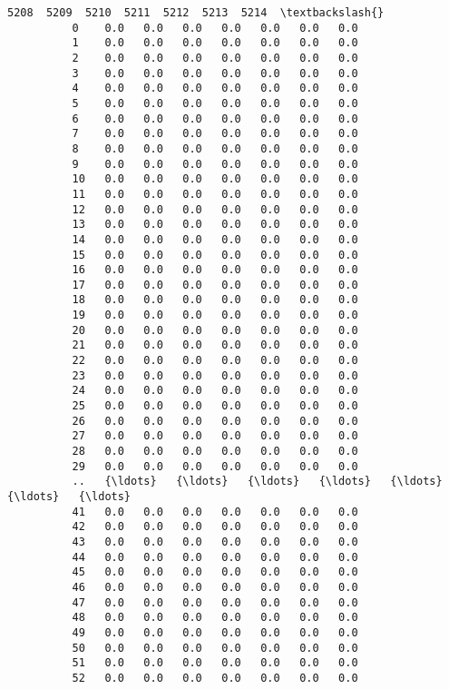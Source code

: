\documentclass[11pt]{article}
\begin{document}
\begin{Verbatim}[commandchars=\\\{\}]
              5208  5209  5210  5211  5212  5213  5214  \textbackslash{}
          0    0.0   0.0   0.0   0.0   0.0   0.0   0.0   
          1    0.0   0.0   0.0   0.0   0.0   0.0   0.0   
          2    0.0   0.0   0.0   0.0   0.0   0.0   0.0   
          3    0.0   0.0   0.0   0.0   0.0   0.0   0.0   
          4    0.0   0.0   0.0   0.0   0.0   0.0   0.0   
          5    0.0   0.0   0.0   0.0   0.0   0.0   0.0   
          6    0.0   0.0   0.0   0.0   0.0   0.0   0.0   
          7    0.0   0.0   0.0   0.0   0.0   0.0   0.0   
          8    0.0   0.0   0.0   0.0   0.0   0.0   0.0   
          9    0.0   0.0   0.0   0.0   0.0   0.0   0.0   
          10   0.0   0.0   0.0   0.0   0.0   0.0   0.0   
          11   0.0   0.0   0.0   0.0   0.0   0.0   0.0   
          12   0.0   0.0   0.0   0.0   0.0   0.0   0.0   
          13   0.0   0.0   0.0   0.0   0.0   0.0   0.0   
          14   0.0   0.0   0.0   0.0   0.0   0.0   0.0   
          15   0.0   0.0   0.0   0.0   0.0   0.0   0.0   
          16   0.0   0.0   0.0   0.0   0.0   0.0   0.0   
          17   0.0   0.0   0.0   0.0   0.0   0.0   0.0   
          18   0.0   0.0   0.0   0.0   0.0   0.0   0.0   
          19   0.0   0.0   0.0   0.0   0.0   0.0   0.0   
          20   0.0   0.0   0.0   0.0   0.0   0.0   0.0   
          21   0.0   0.0   0.0   0.0   0.0   0.0   0.0   
          22   0.0   0.0   0.0   0.0   0.0   0.0   0.0   
          23   0.0   0.0   0.0   0.0   0.0   0.0   0.0   
          24   0.0   0.0   0.0   0.0   0.0   0.0   0.0   
          25   0.0   0.0   0.0   0.0   0.0   0.0   0.0   
          26   0.0   0.0   0.0   0.0   0.0   0.0   0.0   
          27   0.0   0.0   0.0   0.0   0.0   0.0   0.0   
          28   0.0   0.0   0.0   0.0   0.0   0.0   0.0   
          29   0.0   0.0   0.0   0.0   0.0   0.0   0.0   
          ..   {\ldots}   {\ldots}   {\ldots}   {\ldots}   {\ldots}   {\ldots}   {\ldots}   
          41   0.0   0.0   0.0   0.0   0.0   0.0   0.0   
          42   0.0   0.0   0.0   0.0   0.0   0.0   0.0   
          43   0.0   0.0   0.0   0.0   0.0   0.0   0.0   
          44   0.0   0.0   0.0   0.0   0.0   0.0   0.0   
          45   0.0   0.0   0.0   0.0   0.0   0.0   0.0   
          46   0.0   0.0   0.0   0.0   0.0   0.0   0.0   
          47   0.0   0.0   0.0   0.0   0.0   0.0   0.0   
          48   0.0   0.0   0.0   0.0   0.0   0.0   0.0   
          49   0.0   0.0   0.0   0.0   0.0   0.0   0.0   
          50   0.0   0.0   0.0   0.0   0.0   0.0   0.0   
          51   0.0   0.0   0.0   0.0   0.0   0.0   0.0   
          52   0.0   0.0   0.0   0.0   0.0   0.0   0.0   

\end{Verbatim}
\end{document}
